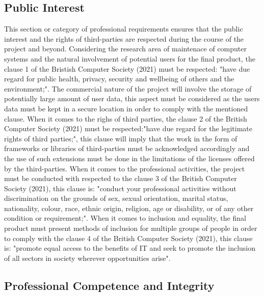 \subsection{Public Interest}

This section or category of professional requirements ensures that the public interest and
the rights of third-parties are respected during the course of the project and beyond.
Considering the research area of maintenace of computer systems and the natural involvement
of potential users for the final product, the clause 1 of the Bristish Computer
Society (2021) must be respected: "have due regard for public health, privacy, security and
wellbeing of others and the environment;". The commercial nature of the project will involve
the storage of potentially large amount of user data, this aspect must be considered as the
users data must be kept in a secure location in order to comply with the mentioned clause.
When it comes to the righs of third parties, the clause 2 of the British Computer Society (2021)
must be respected:"have due regard for the legitimate rights of third parties;",
this clause will imply that the work in the form of frameworks or libraries of
third-parties must be acknowledged accordingly and the use of such extensions
must be done in the limitations of the licenses offered by the third-parties.
When it comes to the professional activities, the project must be conducted with
respected to the clause 3 of the British Computer Society (2021), this clause is:
"conduct your professional activities without discrimination on the grounds of sex,
sexual orientation, marital status, nationality, colour, race, ethnic origin, religion,
age or disability, or of any other condition or requirement;".
When it comes to inclusion and equality, the final product must present methods of inclusion
for multiple groups of people in order to comply with the clause 4 of the British Computer Society (2021),
this clause is: "promote equal access to the benefits of IT and seek to promote the inclusion of all sectors
in society wherever opportunities arise".

\subsection{Professional Competence and Integrity}

